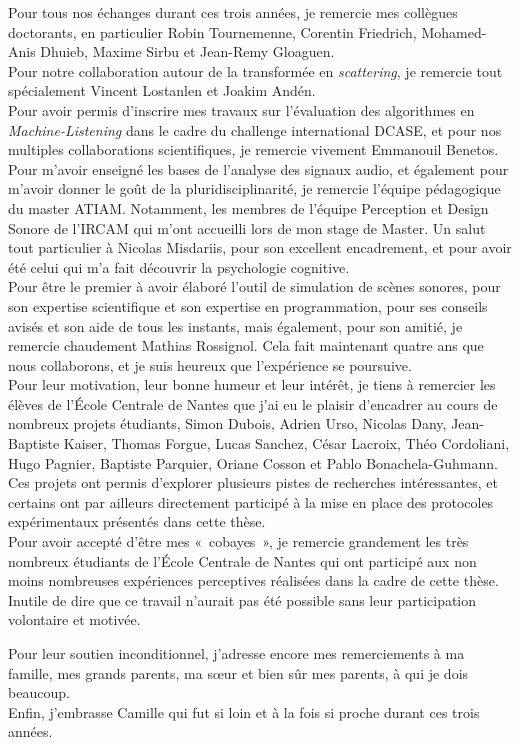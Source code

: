 Pour tous nos échanges durant ces trois années, je remercie mes collègues doctorants, en particulier Robin Tournemenne, Corentin Friedrich, Mohamed-Anis Dhuieb, Maxime Sirbu et Jean-Remy Gloaguen. \\

Pour notre collaboration autour de la transformée en \textit{scattering}, je remercie tout spécialement Vincent Lostanlen et Joakim Andén. \\

Pour avoir permis d'inscrire mes travaux sur l'évaluation des algorithmes en \textit{Machine-Listening} dans le cadre du challenge international DCASE, et pour nos multiples collaborations scientifiques, je remercie vivement Emmanouil Benetos. \\

Pour m'avoir enseigné les bases de l'analyse des signaux audio, et également pour m'avoir donner le goût de la pluridisciplinarité, je remercie l'équipe pédagogique du master ATIAM. Notamment, les membres de l'équipe Perception et Design Sonore de l'IRCAM qui m'ont accueilli lors de mon stage de Master. Un salut tout particulier à Nicolas Misdariis, pour son excellent encadrement, et pour avoir été celui qui m'a fait découvrir la psychologie cognitive. \\

Pour être le premier à avoir élaboré l'outil de simulation de scènes sonores, pour son expertise scientifique et son expertise en programmation, pour ses conseils avisés et son aide de tous les instants, mais également, pour son amitié, je remercie chaudement Mathias Rossignol. Cela fait maintenant quatre ans que nous collaborons, et je suis heureux que l'expérience se poursuive. \\

Pour leur motivation, leur bonne humeur et leur intérêt, je tiens à remercier les élèves de l'École Centrale de Nantes que j'ai eu le plaisir d'encadrer au cours de nombreux projets étudiants, Simon Dubois, Adrien Urso, Nicolas Dany, Jean-Baptiste Kaiser, Thomas Forgue, Lucas Sanchez, César Lacroix, Théo Cordoliani, Hugo Pagnier, Baptiste Parquier, Oriane Cosson et Pablo Bonachela-Guhmann. Ces projets ont permis d'explorer plusieurs pistes de recherches intéressantes, et certains ont par ailleurs directement participé à la mise en place des protocoles expérimentaux présentés dans cette thèse. \\

Pour avoir accepté d'être mes «~cobayes~», je remercie grandement les très nombreux étudiants de l'École Centrale de Nantes qui ont participé aux non moins nombreuses expériences perceptives réalisées dans la cadre de cette thèse. Inutile de dire que ce travail n'aurait pas été possible sans leur participation volontaire et motivée.

Pour leur soutien inconditionnel, j'adresse encore mes remerciements à ma famille, mes grands parents, ma sœur et bien sûr mes parents, à qui je dois beaucoup. \\

Enfin, j'embrasse Camille qui fut si loin et à la fois si proche durant ces trois années.


\endgroup



